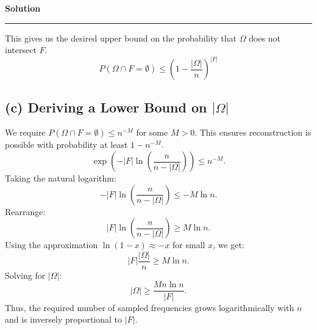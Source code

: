 \documentclass[a4paper,12pt]{article}
\newenvironment{solution}[2][]{%
    \begin{mdframed}[linecolor=blue!70!black, linewidth=2pt, roundcorner=10pt, backgroundcolor=yellow!10!white, skipabove=12pt, skipbelow=12pt]%
        \textbf{\large #2}
        \par\noindent\rule{\textwidth}{0.4pt}
}{
    \end{mdframed}
}
\begin{document}
\begin{solution}{Solution}
  This gives us the desired upper bound on the probability that $\Omega$ does not intersect $F$.
  \begin{equation}
    P(\Omega \cap F = \emptyset) \leq \left(1 - \frac{|\Omega|}{n}\right)^{|F|}
  \end{equation}
   
  \subsection*{(c) Deriving a Lower Bound on $|\Omega|$}
   
  We require $P(\Omega \cap F = \emptyset) \leq n^{-M}$ for some $M > 0$. This ensures reconstruction is possible with probability at least $1 - n^{-M}$.
  \begin{equation}
  \exp\left(-|F| \ln \left(\frac{n}{n - |\Omega|}\right)\right) \leq n^{-M}.
  \end{equation}
  Taking the natural logarithm:
  \begin{equation}
  -|F| \ln \left(\frac{n}{n - |\Omega|}\right) \leq -M \ln n.
  \end{equation}
  Rearrange:
  \begin{equation}
  |F| \ln \left(\frac{n}{n - |\Omega|}\right) \geq M \ln n.
  \end{equation}
  Using the approximation $\ln(1 - x) \approx -x$ for small $x$, we get:
  \begin{equation}
  |F| \frac{|\Omega|}{n} \geq M \ln n.
  \end{equation}
  Solving for $|\Omega|$:
  \begin{equation}
  |\Omega| \geq \frac{M n \ln n}{|F|}.
  \end{equation}
  Thus, the required number of sampled frequencies grows logarithmically with $n$ and is inversely proportional to $|F|$.
   

\end{solution}
\end{document}
